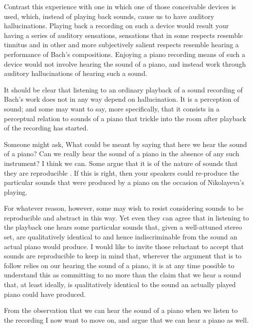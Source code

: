 \documentclass[sloppy, journal, git, bytitle, dodraft]{humapap}
\begin{document}
Contrast this experience with one in which one of those conceivable devices is used, which, instead of playing back sounds, cause us to have auditory hallucinations. Playing back a recording on such a device would result your having a series of auditory sensations, sensations that in some respects resemble tinnitus and in other and more subjectively salient respects resemble hearing a performance of Bach's compositions. Enjoying a piano recording means of such a device would not involve hearing the sound of a piano, and instead work through auditory hallucinations of hearing such a sound. 

It should be clear that listening to an ordinary playback of a sound recording of Bach's work does not in any way depend on hallucination. It is a perception of sound; and some may want to say, more specifically, that it consists in a perceptual relation to sounds of a piano that trickle into the room after playback of the recording has started.

Someone might ask, What could be meant by saying that here we hear the sound of a piano? Can we really hear the sound of a piano in the absence of any such instrument? I think we can. Some argue that it is of the nature of sounds that they are reproducible \autocite{martin2012aa}. If this is right, then your speakers could re-produce the particular sounds that were produced by a piano on the occasion of Nikolayeva's playing. 

For whatever reason, however, some may wish to resist considering sounds to be reproducible and abstract in this way. Yet even they can agree that in listening to the playback one hears some particular sounds that, given a well-attuned stereo set, are qualitatively identical to and hence indiscriminable from the sound an actual piano would produce. I would like to invite those reluctant to accept that sounds are reproducible to keep in mind that, wherever the argument that is to follow relies on our hearing the sound of a piano, it is at any time possible to understand this as committing to no more than the claim that we hear a sound that, at least ideally, is qualitatively identical to the sound an actually played piano could have produced. 


\sect From the observation that we can hear the sound of a piano when we listen to the recording I now want to move on, and argue that we can hear a piano as well. 
\end{document}
